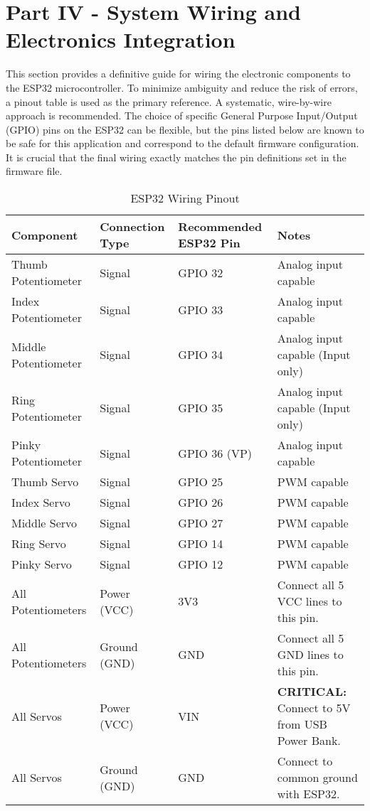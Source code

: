\documentclass{article}
\begin{document}
\newpage
\section{Part IV - System Wiring and Electronics Integration}
This section provides a definitive guide for wiring the electronic components to the ESP32 microcontroller. To minimize ambiguity and reduce the risk of errors, a pinout table is used as the primary reference. A systematic, wire-by-wire approach is recommended. The choice of specific General Purpose Input/Output (GPIO) pins on the ESP32 can be flexible, but the pins listed below are known to be safe for this application and correspond to the default firmware configuration. It is crucial that the final wiring exactly matches the pin definitions set in the firmware file.

\begin{table}[h!]
\centering
\caption{ESP32 Wiring Pinout}
\begin{tabular}{|p{4cm}|p{3cm}|p{3cm}|p{4cm}|}
\hline
\textbf{Component} & \textbf{Connection Type} & \textbf{Recommended ESP32 Pin} & \textbf{Notes} \\
\hline
Thumb Potentiometer & Signal & GPIO 32 & Analog input capable \\
\hline
Index Potentiometer & Signal & GPIO 33 & Analog input capable \\
\hline
Middle Potentiometer & Signal & GPIO 34 & Analog input capable (Input only) \\
\hline
Ring Potentiometer & Signal & GPIO 35 & Analog input capable (Input only) \\
\hline
Pinky Potentiometer & Signal & GPIO 36 (VP) & Analog input capable \\
\hline
Thumb Servo & Signal & GPIO 25 & PWM capable \\
\hline
Index Servo & Signal & GPIO 26 & PWM capable \\
\hline
Middle Servo & Signal & GPIO 27 & PWM capable \\
\hline
Ring Servo & Signal & GPIO 14 & PWM capable \\
\hline
Pinky Servo & Signal & GPIO 12 & PWM capable \\
\hline
All Potentiometers & Power (VCC) & 3V3 & Connect all 5 VCC lines to this pin. \\
\hline
All Potentiometers & Ground (GND) & GND & Connect all 5 GND lines to this pin. \\
\hline
All Servos & Power (VCC) & VIN & \textbf{CRITICAL:} Connect to 5V from USB Power Bank. \\
\hline
All Servos & Ground (GND) & GND & Connect to common ground with ESP32. \\
\hline
\end{tabular}
\end{table}
\end{document}
